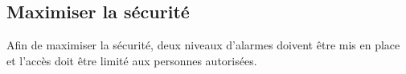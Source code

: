 

\subsection{Maximiser la sécurité}
\label{s:beo_obj_optisecu}

Afin de maximiser la sécurité, deux niveaux d’alarmes doivent être mis en place et l'accès doit être limité aux personnes autorisées.
